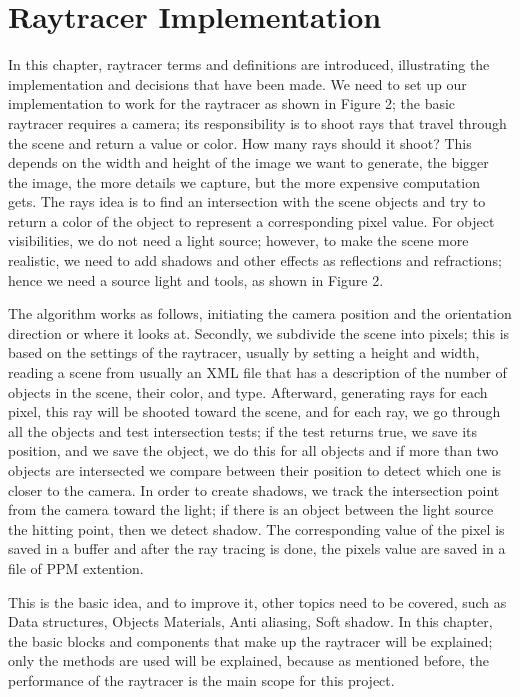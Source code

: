 \documentclass[11pt,a4paper]{article}
\begin{document}
	\section{Raytracer Implementation}
	In this chapter, raytracer terms and definitions are introduced, illustrating the implementation and decisions that have been made. 
	We need to set up our implementation to work for the raytracer as shown in Figure 2; the basic raytracer requires a camera; its responsibility is to shoot rays that travel through the scene and return a value or color. How many rays should it shoot? This depends on the width and height of the image we want to generate, the bigger the image, the more details we capture, but the more expensive computation gets. The rays idea is to find an intersection with the scene objects and try to return a color of the object to represent a corresponding pixel value. For object visibilities, we do not need a light source; however, to make the scene more realistic, we need to add shadows and other effects as reflections and refractions; hence we need a source light and tools, as shown in Figure 2.
	
	The algorithm works as follows, initiating the camera position and the orientation direction or where it looks at. Secondly, we subdivide the scene into pixels; this is based on the settings of the raytracer, usually by setting a height and width, reading a scene from usually an XML file that has a description of the number of objects in the scene, their color, and type. Afterward, generating rays for each pixel, this ray will be shooted toward the scene, and for each ray, we go through all the objects and test intersection tests; if the test returns true, we save its position, and we save the object, we do this for all objects and if more than two objects are intersected we compare between their position to detect which one is closer to the camera. In order to create shadows, we track the intersection point from the camera toward the light; if there is an object between the light source the hitting point, then we detect shadow. The corresponding value of the pixel is saved in a buffer and after the ray tracing is done, the pixels value are saved in a file of PPM extention.
	
	This is the basic idea, and to improve it, other topics need to be covered, such as Data structures, Objects Materials, Anti aliasing, Soft shadow. In this chapter, the basic blocks and components that make up the raytracer will be explained; only the methods are used will be explained, because as mentioned before, the performance of the raytracer is the main scope for this project.
	 
\end{document}
